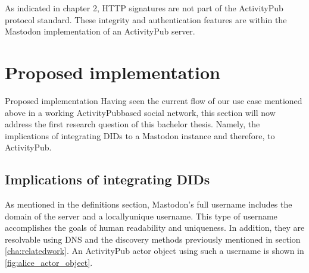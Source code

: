 As indicated in chapter 2, HTTP signatures are not part of the ActivityPub protocol standard. These integrity and authentication features are within the Mastodon implementation of an ActivityPub server.


\section{Proposed implementation}\label{section:did_flow}
Proposed implementation
Having seen the current flow of our use case mentioned above in a working ActivityPub\-based social network, this section will now address the first research question of this bachelor thesis. Namely, the implications of integrating DIDs to a Mastodon instance and therefore, to ActivityPub. 

\subsection{Implications of integrating DIDs}
As mentioned in the definitions section, Mastodon's full username includes the domain of the server and a locally\-unique username. This type of username accomplishes the goals of human readability and uniqueness. In addition, they are resolvable using DNS and the discovery methods previously mentioned in section \autoref{cha:relatedwork}. An ActivityPub actor object using such a username is shown in \ref{fig:alice_actor_object}.  


